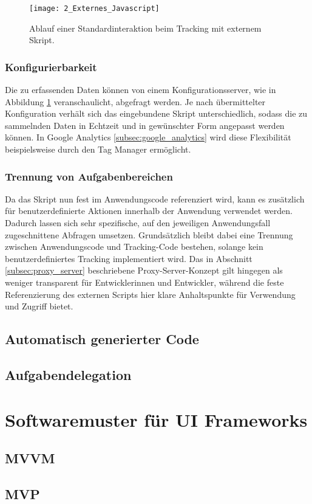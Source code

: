 \begin{figure}
\centering
\texttt{[image: 2\_Externes\_Javascript]}
\caption{Ablauf einer Standardinteraktion beim Tracking mit externem Skript.}
\label{fig:external_javascript}
\end{figure}

\subsubsection{Konfigurierbarkeit}
Die zu erfassenden Daten können von einem Konfigurationsserver, wie in Abbildung \ref{fig:external_javascript} veranschaulicht, abgefragt werden. Je nach übermittelter Konfiguration verhält sich das eingebundene Skript unterschiedlich, sodass die zu sammelnden Daten in Echtzeit und in gewünschter Form angepasst werden können. In Google Analytics \ref{subsec:google_analytics} wird diese Flexibilität beispielsweise durch den Tag Manager ermöglicht.

\subsubsection{Trennung von Aufgabenbereichen}
Da das Skript nun fest im Anwendungscode referenziert wird, kann es zusätzlich für benutzerdefinierte Aktionen innerhalb der Anwendung verwendet werden. Dadurch lassen sich sehr spezifische, auf den jeweiligen Anwendungsfall zugeschnittene Abfragen umsetzen. Grundsätzlich bleibt dabei eine Trennung zwischen Anwendungscode und Tracking-Code bestehen, solange kein benutzerdefiniertes Tracking implementiert wird.  
Das in Abschnitt \ref{subsec:proxy_server} beschriebene Proxy-Server-Konzept gilt hingegen als weniger transparent für Entwicklerinnen und Entwickler, während die feste Referenzierung des externen Scripts hier klare Anhaltspunkte für Verwendung und Zugriff bietet.

\subsection{Automatisch generierter Code}
\label{subsec:autogenerated_code}


\subsection{Aufgabendelegation}
\label{subsec:task_delegation}

\section{Softwaremuster für UI Frameworks}
\label{subsec:patterns}

\subsection{MVVM}
\label{subsec:mvvm}

\subsection{MVP}
\label{subsec:mvp}






